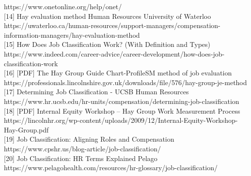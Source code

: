 \documentclass[./main.tex]{subfiles}
\begin{document}
https://www.onetonline.org/help/onet/\\
{[}14{]} Hay evaluation method \textbar{} Human Resources \textbar{}
University of Waterloo
https://uwaterloo.ca/human-resources/support-managers/compensation-information-managers/hay-evaluation-method\\
{[}15{]} How Does Job Classification Work? (With Definition and Types)
https://www.indeed.com/career-advice/career-development/how-does-job-classification-work\\
{[}16{]} {[}PDF{]} The Hay Group Guide Chart-ProfileSM method of job
evaluation
https://professionals.lincolnshire.gov.uk/downloads/file/576/hay-group-je-method\\
{[}17{]} Determining Job Classification - UCSB Human Resources
https://www.hr.ucsb.edu/hr-units/compensation/determining-job-classification\\
{[}18{]} {[}PDF{]} Internal Equity Workshop -- Hay Group Work
Measurement Process
https://lincolnhr.org/wp-content/uploads/2009/12/Internal-Equity-Workshop-Hay-Group.pdf\\
{[}19{]} Job Classification: Aligning Roles and Compensation
https://www.cpshr.us/blog-article/job-classification/\\
{[}20{]} Job Classification: HR Terms Explained \textbar{} Pelago
https://www.pelagohealth.com/resources/hr-glossary/job-classification/\\
\end{document}
